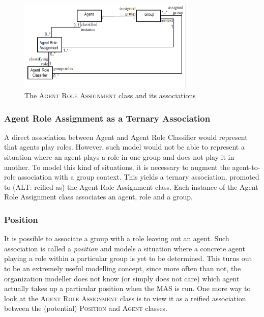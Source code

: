 \begin{figure}[ht]
	\centering
	\includegraphics[width=0.75\textwidth]{images/onp/agent-role-assignment.png}
	\caption{The \textsc{Agent Role Assignment} class and its associations}
	\label{figure:onp-agent-role-assignment}
\end{figure}

\subsubsection*{Agent Role Assignment as a Ternary Association}

A direct association between Agent and Agent Role Classifier would represent that agents play roles.
However, such model would not be able to represent a situation where an agent plays a role in one group and does not play it in another.
To model this kind of situations, it is necessary to augment the agent-to-role association with a group context.
This yields a ternary association, promoted to (ALT: reified as) the Agent Role Assignment class.
Each instance of the Agent Role Assignment class associates an agent, role and a group.

\subsubsection*{Position}

It is possible to associate a group with a role leaving out an agent.
Such association is called a \textit{position} and models a situation where a concrete agent playing a role within a particular group is yet to be determined.
This turns out to be an extremely useful modelling concept, since more often than not, the organization modeller does not know (or simply does not care) which agent actually takes up a particular position when the MAS is run.
One more way to look at the \textsc{Agent Role Assignment} class is to view it as a reified association between the (potential) \textsc{Position} and \textsc{Agent} classes.